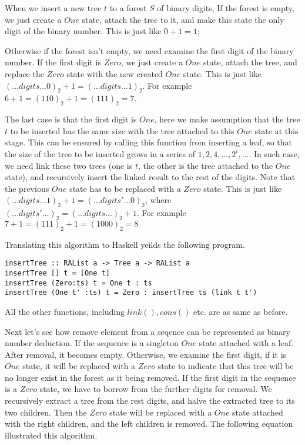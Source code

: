 \documentclass{article}
\begin{document}
When we insert a new tree $t$ to a forest $S$ of binary digits, If the forest is empty, we 
just create a $One$ state, attach the tree to it, and make this state the only 
digit of the binary number. This is just like $0 + 1 = 1$; 

Otherwise if the forest isn't empty, we need examine the first digit of the binary number. If the first digit
is $Zero$, we just create a $One$ state, attach the tree, and replace the $Zero$ state
with the new created $One$ state. This is just like $(...digits...0)_2 + 1 = (...digits...1)_2$.
For example $6 + 1 = (110)_2 + 1 = (111)_2 = 7$. 

The last case is that the first
digit is $One$, here we make assumption that the tree $t$ to be inserted has the 
same size with the tree attached to this $One$ state at this stage. 
This can be ensured by calling this function from inserting a leaf, so that the size
of the tree to be inserted grows in a series of $1, 2, 4, ..., 2^i, ...$. In such
case, we need link these two trees (one is $t$, the other is the tree attached to 
the $One$ state), and recursively insert the linked result to the rest of the digits.
Note that the previous $One$ state has to be replaced with a $Zero$ state. This
is just like $(...digits...1)_2 + 1 = (...digits'...0)_2$, where $(...digits'...)_2 = (...digits...)_2+1$.
For example $7 + 1 = (111)_2 + 1 = (1000)_2 = 8$

Translating this algorithm to Haskell yeilds the following program.

\begin{lstlisting}
insertTree :: RAList a -> Tree a -> RAList a
insertTree [] t = [One t]
insertTree (Zero:ts) t = One t : ts
insertTree (One t' :ts) t = Zero : insertTree ts (link t t')
\end{lstlisting}

All the other functions, including $link(), cons()$ etc. are as same as before.

Next let's see how remove element from a seqence can be represented as binary number
deduction. If the sequence is a singleton $One$ state attached with a leaf.
After removal, it becomes empty. Otherwise, we examine the first digit, if
it is $One$ state, it will be replaced with a $Zero$ state to indicate that
this tree will be no longer exist in the forest as it being removed.
If the first digit in the sequence is a $Zero$ state, we have to borrow
from the further digits for removal. We recursively extract a tree from
the rest digits, and halve the extracted tree to its two children. Then
the $Zero$ state will be replaced with a $One$ state attached with the 
right children, and the left children is removed. The following equation
illustrated this algorithm.
\end{document}
